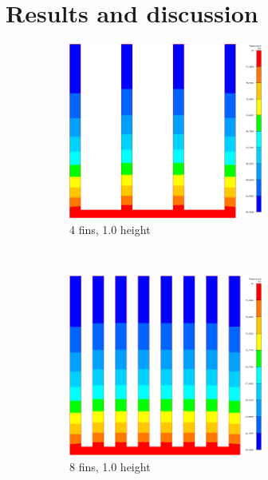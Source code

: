 \section{Results and discussion}

\begin{figure}[ht]
\begin{subfigure}[t] {0.23\textwidth}
\centering
\includegraphics[width=0.7\textwidth]{../figures/heatsink4_h105_gmf005.png}
\caption{4 fins, \num{1.0} height}
\label{fig:mesh_temps_res_4_1}
\end{subfigure}
~
\begin{subfigure}[t] {0.23\textwidth}
\centering
\includegraphics[width=0.7\textwidth]{../figures/heatsink8_h105_gmf005.png}
\caption{8 fins, \num{1.0} height}
\label{fig:mesh_temps_res_8_1}
\end{subfigure}
~
\begin{subfigure}[t] {0.23\textwidth}

\end{subfigure}
\end{figure}
